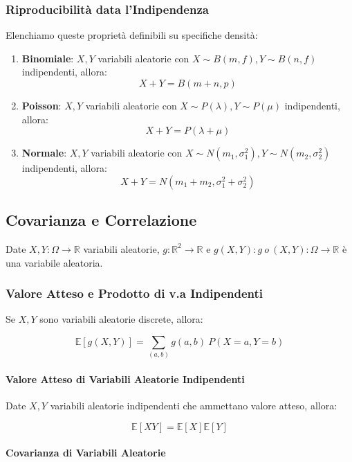 \documentclass{article}
\begin{document}
\subsubsection{Riproducibilità data l'Indipendenza}

Elenchiamo queste proprietà definibili su specifiche densità:

\begin{enumerate}
    \item \textbf{Binomiale}: $X,Y$ variabili aleatorie con $X \sim B(m,f), Y \sim B(n,f)$ indipendenti, allora:
    \[ X + Y = B(m+n,p) \]
    \item \textbf{Poisson}: $X,Y$ variabili aleatorie con $X \sim P(\lambda), Y \sim P(\mu)$ indipendenti, allora:
    \[ X + Y = P(\lambda + \mu) \]
    \item \textbf{Normale}: $X,Y$ variabili aleatorie con $X \sim N(m_{1}, \sigma^{2}_{1}), Y \sim N(m_{2}, \sigma^{2}_{2})$ indipendenti, allora:
    \[ X + Y = N(m_{1} + m_{2}, \sigma^{2}_{1} + \sigma^{2}_{2}) \]
\end{enumerate}

\subsection{Covarianza e Correlazione}

Date $X,Y: \Omega \rightarrow \mathbb{R}$ variabili aleatorie, $g: \mathbb{R}^{2} \rightarrow \mathbb{R}$ e $g(X,Y): g \:o\:(X,Y): \Omega \rightarrow \mathbb{R}$ è una variabile aleatoria.

\subsubsection{Valore Atteso e Prodotto di v.a Indipendenti}

Se $X,Y$ sono variabili aleatorie discrete, allora:

\[ \mathbb{E}[g(X,Y)] = \sum_{(a,b)} g(a,b) \: P(X = a, Y = b) \]

\paragraph{Valore Atteso di Variabili Aleatorie Indipendenti}

Date $X,Y$ variabili aleatorie indipendenti che ammettano valore atteso, allora:

\[ \mathbb{E}[XY] = \mathbb{E}[X] \mathbb{E}[Y] \]

\paragraph{Covarianza di Variabili Aleatorie}
\end{document}
